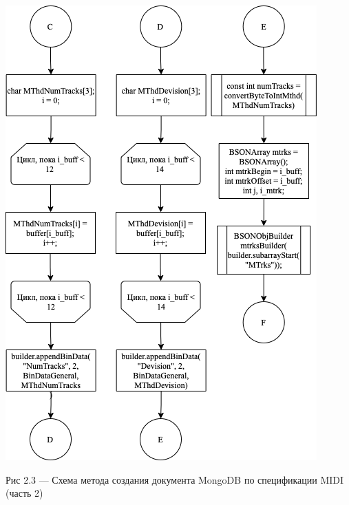 \begin{center}
		\includegraphics[scale=0.7]{tex/img/Parser2_1.png}
		
			Рис 2.3 — Схема метода создания документа MongoDB по спецификации MIDI (часть 2)
\end{center}

